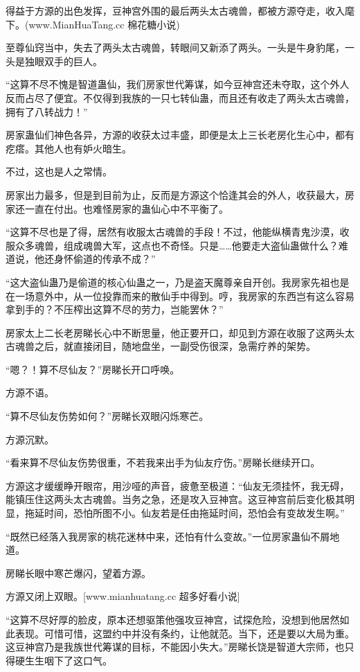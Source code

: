 
\begin{this_body}

得益于方源的出色发挥，豆神宫外围的最后两头太古魂兽，都被方源夺走，收入麾下。(www.MianHuaTang.cc 棉花糖小说)

至尊仙窍当中，失去了两头太古魂兽，转眼间又新添了两头。一头是牛身豹尾，一头是独眼双手的巨人。

“这算不尽不愧是智道蛊仙，我们房家世代筹谋，如今豆神宫还未夺取，这个外人反而占尽了便宜。不仅得到我族的一只七转仙蛊，而且还有收走了两头太古魂兽，拥有了八转战力！”

房家蛊仙们神色各异，方源的收获太过丰盛，即便是太上三长老房化生心中，都有疙瘩。其他人也有妒火暗生。

不过，这也是人之常情。

房家出力最多，但是到目前为止，反而是方源这个恰逢其会的外人，收获最大，房家还一直在付出。也难怪房家的蛊仙心中不平衡了。

“这算不尽也是了得，居然有收服太古魂兽的手段！不过，他能纵横青鬼沙漠，收服众多魂兽，组成魂兽大军，这点也不奇怪。只是……他要走大盗仙蛊做什么？难道说，他还身怀偷道的传承不成？”

“这大盗仙蛊乃是偷道的核心仙蛊之一，乃是盗天魔尊亲自开创。我房家先祖也是在一场意外中，从一位投靠而来的散仙手中得到。哼，我房家的东西岂有这么容易拿到手的？不压榨出这算不尽的劳力，岂能罢休？”

房家太上二长老房睇长心中不断思量，他正要开口，却见到方源在收服了这两头太古魂兽之后，就直接闭目，随地盘坐，一副受伤很深，急需疗养的架势。

“嗯？！算不尽仙友？”房睇长开口呼唤。

方源不语。

“算不尽仙友伤势如何？”房睇长双眼闪烁寒芒。

方源沉默。

“看来算不尽仙友伤势很重，不若我来出手为仙友疗伤。”房睇长继续开口。

方源这才缓缓睁开眼帘，用沙哑的声音，疲惫至极道：“仙友无须挂怀，我无碍，能镇压住这两头太古魂兽。当务之急，还是攻入豆神宫。这豆神宫前后变化极其明显，拖延时间，恐怕所图不小。仙友若是任由拖延时间，恐怕会有变故发生啊。”

“既然已经落入我房家的桃花迷林中来，还怕有什么变故。”一位房家蛊仙不屑地道。

房睇长眼中寒芒爆闪，望着方源。

方源又闭上双眼。[www.mianhuatang.cc 超多好看小说]

“这算不尽好厚的脸皮，原本还想驱策他强攻豆神宫，试探危险，没想到他居然如此表现。可惜可惜，这盟约中并没有条约，让他就范。当下，还是要以大局为重。这豆神宫乃是我族世代筹谋的目标，不能因小失大。”房睇长饶是智道大宗师，也只得硬生生咽下了这口气。


\end{this_body}
